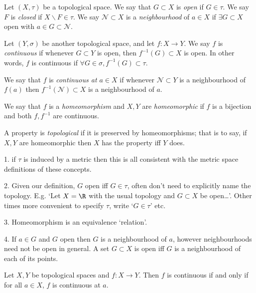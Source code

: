 \begin{definition}
    Let $(X,\tau)$ be a topological space. We say that $G\subset X$ is \emph{open} if $G\in \tau$. We say $F$ is \emph{closed} if $X \backslash F \in\tau$. We say $\mathcal{N} \subset X$ is a \emph{neighbourhood} of $a\in X$ if $\exists G\subset X$ open with $a\in G\subset \mathcal{N}$.
    
    Let $(Y,\sigma)$ be another topological space, and let $f:X\rightarrow Y$. We say $f$ is \emph{continuous} if whenever $G\subset Y$ is open, then $f^{-1}(G)\subset X$ is open. In other words, $f$ is continuous if $\forall G\in \sigma, f^{-1}(G)\subset \tau$.
    
    We say that $f$ is \emph{continuous at $a \in X$} if whenever $\mathcal{N} \subset Y$ is a neighbourhood of $f(a)$ then $f^{-1}(\mathcal{N})\subset X$ is a neighbourhood of $a$.
    
    We say that $f$ is a \emph{homeomorphism} and $X,Y$ are \emph{homeomorphic} if $f$ is a bijection and both $f,f^{-1}$ are continuous. 
    
    A property is \emph{topological} if it is preserved by homeomorphisms; that is to say, if $X,Y$ are homeomorphic then $X$ has the property iff $Y$ does.
\end{definition}

\begin{remark}
1. if $\tau$ is induced by a metric then this is all consistent with the metric space definitions of these concepts.

2. Given our definition, $G$ open iff $G\in \tau$, often don't need to explicitly name the topology. E.g. `Let $X=\R$ with the usual topology and $G\subset X$ be open\dots'. Other times more convenient to specify $\tau$, write `$G\in \tau$' etc.

3. Homeomorphism is an equivalence `relation'.

4. If $a\in G$ and $G$ open then $G$ is a neighbourhood of $a$, however neighbourhoods need not be open in general. A set $G\subset X$ is open iff $G$ is a neighbourhood of each of its points.
\end{remark}

\begin{proposition}             %
Let $X,Y$ be topological spaces and $f: X\rightarrow Y$. Then $f$ is continuous if and only if for all $a\in X$, $f$ is continuous at $a$.
\end{proposition}      


